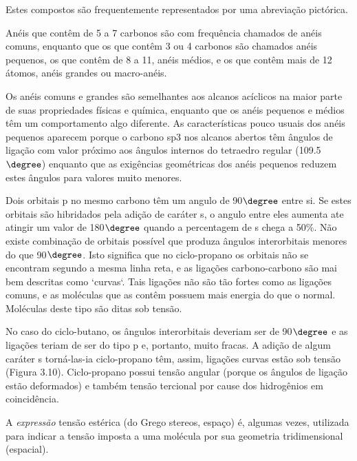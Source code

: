 \noindent Estes compostos são frequentemente representados por uma abreviação pictórica.

\begin{figure}[H]
    \centering
    \quad\quad\quad\quad
    \quad\quad\quad\quad
    \quad\quad\quad\quad
    \chemnameinit{}
\end{figure}

\noindent Anéis que contêm de 5 a 7 carbonos são com frequência chamados de anéis comuns, enquanto que os que contêm 3 ou 4 carbonos são chamados anéis pequenos, os que contêm de 8 a 11, anéis médios, e os que contêm mais de 12 átomos, anéis grandes ou macro-anéis. 

Os anéis comuns e grandes são semelhantes aos alcanos acíclicos na maior parte de suas propriedades físicas e química, enquanto que os anéis pequenos e médios têm um comportamento algo diferente. As características pouco usuais dos anéis pequenos aparecem porque o carbono sp3 nos alcanos abertos têm ângulos de ligação com valor próximo aos ângulos internos do tetraedro regular (109.5$\degree$) enquanto que as exigências geométricas dos anéis pequenos reduzem estes ângulos para valores muito menores.

Dois orbitais p no mesmo carbono têm um angulo de 90$\degree$ entre si. Se estes orbitais são hibridados pela adição de caráter s, o angulo entre eles aumenta ate atingir um valor de 180$\degree$ quando a percentagem de s chega a 50\%. Não existe combinação de orbitais possível que produza ângulos interorbitais menores do que 90$\degree$. Isto significa que no ciclo-propano os orbitais não se encontram segundo a mesma linha reta, e as ligações carbono-carbono são mai bem descritas como `curvas`. Tais ligações não são tão fortes como as ligações comuns, e as moléculas que as contêm possuem mais energia do que o normal. Moléculas deste tipo são ditas sob tensão. 

No caso do ciclo-butano, os ângulos interorbitais deveriam ser de 90$\degree$ e as ligações teriam de ser do tipo p e, portanto, muito fracas. A adição de algum caráter s torná-las-ia ciclo-propano têm, assim, ligações curvas estão sob tensão (Figura 3.10). Ciclo-propano possui tensão angular (porque os ângulos de ligação estão deformados) e também tensão tercional por cause dos hidrogênios em coincidência.

\noindent A \emph{expressão} tensão estérica (do Grego stereos, espaço) é, algumas vezes, utilizada para indicar a tensão imposta a uma molécula por sua geometria tridimensional (espacial).

